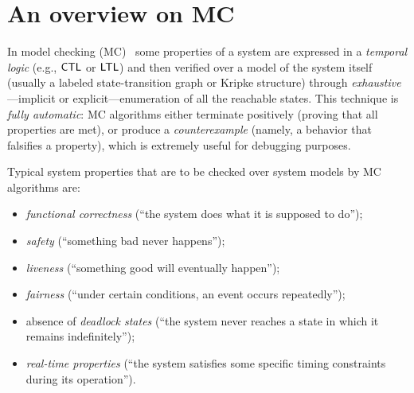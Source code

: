 \section{An overview on MC}
In model checking (MC)~\cite{CE81,CGP02,VW86b,Queille1982} some properties of a %
system are expressed in a \emph{temporal logic} (e.g., $\text{\sffamily CTL}$ or $\text{\sffamily LTL}$) and then verified over a model of the system itself (usually a labeled state-transition graph or Kripke structure) through \emph{exhaustive}---implicit or explicit---enumeration of all the reachable states. This technique is \emph{fully automatic}: MC algorithms
either terminate positively (proving that all properties are met), or produce a \emph{counterexample} (namely, a behavior that falsifies a property), which is extremely useful for debugging purposes.

Typical system properties that are to be checked over system models by MC algorithms are:
\begin{itemize}
	\item \emph{functional correctness} (``the system does what it is supposed to do'');
	\item \emph{safety} (``something bad never happens'');
	\item \emph{liveness} (``something good will eventually happen'');
	\item \emph{fairness} (``under certain conditions, an event occurs repeatedly'');
	\item absence of \emph{deadlock states} (``the system never reaches a state in which it remains indefinitely'');
	\item \emph{real-time properties} (``the system satisfies some specific timing constraints during its operation'').
\end{itemize}

